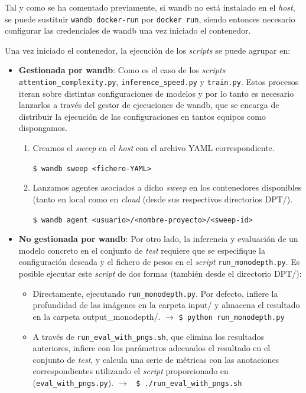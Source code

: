 Tal y como se ha comentado previamente, si wandb no está instalado en el \textit{host}, se puede sustituir \texttt{wandb docker{-}run} por \texttt{docker run}, siendo entonces necesario configurar las credenciales de wandb una vez iniciado el contenedor. 

Una vez iniciado el contenedor, la ejecución de los \textit{scripts} se puede agrupar en:
\begin{itemize}

\item \textbf{Gestionada por wandb}: Como es el caso de los \textit{scripts} \texttt{attention{\_}complexity.py}, \texttt{inference{\_}speed.py} y \texttt{train.py}. Estos procesos iteran sobre distintas configuraciones de modelos y por lo tanto es necesario lanzarlos a través del gestor de ejecuciones de wandb, que se encarga de distribuir la ejecución de las configuraciones en tantos equipos como dispongamos.

\begin{enumerate}

\item Creamos el \textit{sweep} en el \textit{host} con el archivo YAML correspondiente.

\texttt{\$ wandb sweep <fichero{-}YAML>}

\item Lanzamos agentes asociados a dicho \textit{sweep} en los contenedores disponibles (tanto en local como en \textit{cloud} (desde sus respectivos directorios DPT/).

\texttt{\$ wandb agent <usuario>/<nombre{-}proyecto>/<sweep{-}id>}

\end{enumerate}

\item \textbf{No gestionada por wandb}: Por otro lado, la inferencia y evaluación de un modelo concreto en el conjunto de \textit{test} requiere que se especifique la configuración deseada y el fichero de pesos en el \textit{script} \texttt{run{\_}monodepth.py}. Es posible ejecutar este \textit{script} de dos formas (también desde el directorio DPT/):

\begin{itemize}

\item Directamente, ejecutando \texttt{run{\_}monodepth.py}. Por defecto, infiere la profundidad de las imágenes en la carpeta input/ y almacena el resultado en la carpeta output{\_}monodepth/. $\rightarrow$ \texttt{\$ python run{\_}monodepth.py}

\item A través de \texttt{run{\_}eval{\_}with{\_}pngs.sh}, que elimina los resultados anteriores, infiere con los parámetros adecuados el resultado en el conjunto de \textit{test}, y calcula una serie de métricas con las anotaciones correspondientes utilizando el \textit{script} proporcionado en \cite{bts} (\texttt{eval{\_}with{\_}pngs.py}). $\rightarrow$ \texttt{ \$ ./run{\_}eval{\_}with{\_}pngs.sh}

\end{itemize}

\end{itemize}